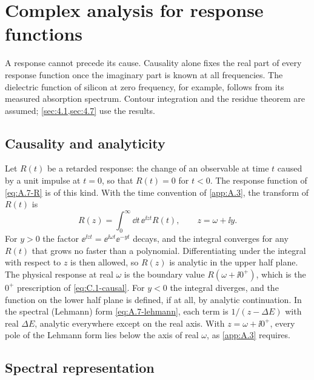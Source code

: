 \section{Complex analysis for response functions}\label{app:C.5}

A response cannot precede its cause. Causality alone fixes the real part of every response function once the imaginary part is known at all frequencies. The dielectric function of silicon at zero frequency, for example, follows from its measured absorption spectrum. Contour integration and the residue theorem are assumed; \cref{sec:4.1,sec:4.7} use the results.

\subsection{Causality and analyticity}

Let $R(t)$ be a retarded response: the change of an observable at time $t$ caused by a unit impulse at $t = 0$, so that $R(t) = 0$ for $t < 0$. The response function of \cref{eq:A.7-R} is of this kind. With the time convention of \cref{app:A.3}, the transform of $R(t)$ is
\begin{equation}
  R(z) = \int_0^\infty\dd t\,\ee^{\ii zt}R(t), \qquad z = \omega + \ii y .
  \label{eq:C.5-Rz}
\end{equation}
For $y > 0$ the factor $\ee^{\ii zt} = \ee^{\ii\omega t}\ee^{-yt}$ decays, and the integral converges for any $R(t)$ that grows no faster than a polynomial. Differentiating under the integral with respect to $z$ is then allowed, so $R(z)$ is analytic in the upper half plane. The physical response at real $\omega$ is the boundary value $R(\omega + \ii0^+)$, which is the $0^+$ prescription of \cref{eq:C.1-causal}. For $y < 0$ the integral diverges, and the function on the lower half plane is defined, if at all, by analytic continuation. In the spectral (Lehmann) form \cref{eq:A.7-lehmann}, each term is $1/(z - \Delta E)$ with real $\Delta E$, analytic everywhere except on the real axis. With $z = \omega + \ii0^+$, every pole of the Lehmann form lies below the axis of real $\omega$, as \cref{app:A.3} requires.

\subsection{Spectral representation}

